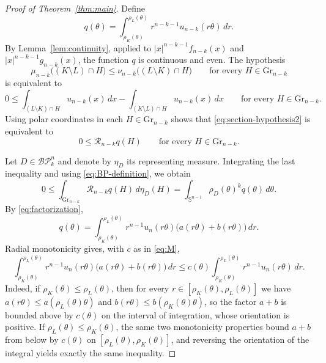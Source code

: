 \documentclass[10pt,a4paper]{amsart}
\newcommand{\BP}{\mathcal{BP}}
\newcommand{\Gr}{\mathrm{Gr}}
\newcommand{\Sph}{\mathbb{S}}
\newcommand{\dd}{\,d}
\begin{document}
\begin{proof}[Proof of Theorem~\ref{thm:main}]
Define
\begin{equation}\label{eq:qtheta}
 q(\theta)=
 \int_{\rho_K(\theta)}^{\rho_L(\theta)}
 r^{n-k-1}u_{n-k}(r\theta)\dd r.
\end{equation}
By Lemma~\ref{lem:continuity}, applied to
$|x|^{n-k-1}f_{n-k}(x)$ and
$|x|^{n-k-1}g_{n-k}(x)$, the function $q$ is continuous and even. The
hypothesis
\[
 \mu_{n-k}\bigl((K\setminus L)\cap H\bigr)
 \leq
 \nu_{n-k}\bigl((L\setminus K)\cap H\bigr)
 \qquad\text{for every }H\in\Gr_{n-k}
\]
is equivalent to
\begin{equation}\label{eq:section-hypothesis2}
 0\leq
 \int_{(L\setminus K)\cap H}u_{n-k}(x)\dd x
 -\int_{(K\setminus L)\cap H}u_{n-k}(x)\dd x
 \qquad\text{for every }H\in\Gr_{n-k}.
\end{equation}
Using polar coordinates in each $H\in\Gr_{n-k}$ shows that
\eqref{eq:section-hypothesis2} is equivalent to
\[
 0\leq\mathcal R_{n-k}q(H)
 \qquad\text{for every }H\in\Gr_{n-k}.
\]

Let $D\in\BP_k^n$ and denote by $\eta_D$ its representing
measure. Integrating the last inequality and using \eqref{eq:BP-definition},
we obtain
\begin{equation}\label{eq:positive-D}
 0\leq\int_{\Gr_{n-k}}\mathcal R_{n-k}q(H)\dd\eta_D(H)
 =\int_{\Sph^{n-1}}\rho_D(\theta)^k q(\theta)\dd\theta.
\end{equation}
By \eqref{eq:factorization},
\[
 q(\theta)
 =\int_{\rho_K(\theta)}^{\rho_L(\theta)}
 r^{n-1}u_n(r\theta)\bigl(a(r\theta)+b(r\theta)\bigr)\dd r.
\]
Radial monotonicity gives, with $c$ as in \eqref{eq:M},
\begin{equation}\label{eq:pointwise-bound}
 \int_{\rho_K(\theta)}^{\rho_L(\theta)}
 r^{n-1}u_n(r\theta)\bigl(a(r\theta)+b(r\theta)\bigr)\dd r
 \leq c(\theta)
 \int_{\rho_K(\theta)}^{\rho_L(\theta)}
 r^{n-1}u_n(r\theta)\dd r.
\end{equation}
Indeed, if $\rho_K(\theta)\leq\rho_L(\theta)$, then for every
$r\in[\rho_K(\theta),\rho_L(\theta)]$ we have
$a(r\theta)\leq a(\rho_L(\theta)\theta)$ and
$b(r\theta)\leq b(\rho_K(\theta)\theta)$, so the factor $a+b$ is bounded above
by $c(\theta)$ on the interval of integration, whose orientation is positive.
If $\rho_L(\theta)\leq\rho_K(\theta)$, the same two monotonicity properties
bound $a+b$ from below by $c(\theta)$ on $[\rho_L(\theta),\rho_K(\theta)]$,
and reversing the orientation of the integral yields exactly the same
inequality.


\end{proof}
\end{document}
